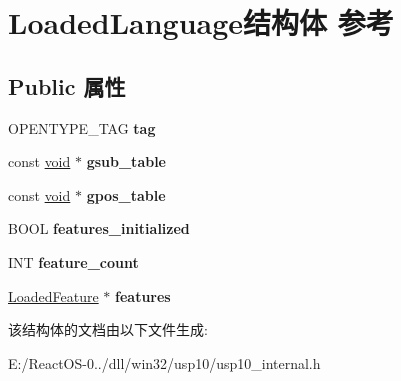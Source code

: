 \hypertarget{struct_loaded_language}{}\section{Loaded\+Language结构体 参考}
\label{struct_loaded_language}
\subsection*{Public 属性}
\begin{DoxyCompactItemize}
\item 
\mbox{\label{struct_loaded_language_a4eb3e7ad2cd17333a05b52f418759ccf}} 
O\+P\+E\+N\+T\+Y\+P\+E\+\_\+\+T\+AG {\bfseries tag}
\item 
\mbox{\label{struct_loaded_language_a8b76a1fa3f909a82a4af872aef759eb7}} 
const \hyperlink{interfacevoid}{void} $\ast$ {\bfseries gsub\+\_\+table}
\item 
\mbox{\label{struct_loaded_language_a6c8e140995dd9cc6aa61b11d63de50c7}} 
const \hyperlink{interfacevoid}{void} $\ast$ {\bfseries gpos\+\_\+table}
\item 
\mbox{\label{struct_loaded_language_a8b1a64e830da265e3a53aedf24c1bc26}} 
B\+O\+OL {\bfseries features\+\_\+initialized}
\item 
\mbox{\label{struct_loaded_language_afe0718e70eb32f61fad7eb47baf31766}} 
I\+NT {\bfseries feature\+\_\+count}
\item 
\mbox{\label{struct_loaded_language_ab547f7564466b365112a2542926fabf4}} 
\hyperlink{struct_loaded_feature}{Loaded\+Feature} $\ast$ {\bfseries features}
\end{DoxyCompactItemize}


该结构体的文档由以下文件生成\+:\begin{DoxyCompactItemize}
\item 
E\+:/\+React\+O\+S-\/0../dll/win32/usp10/usp10\+\_\+internal.\+h\end{DoxyCompactItemize}
